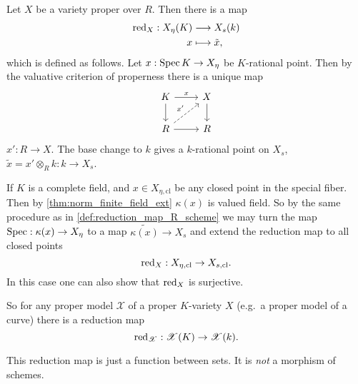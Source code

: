 \begin{definition}\label{def:reduction_map_R_scheme}
	Let $X$ be a variety proper over $R$. 
	Then there is a map 
	\begin{align*}
		\operatorname{red}_X: X_{\eta}(K) &\longrightarrow X_{s}(k) \\
		x &\longmapsto \tilde x
	,\end{align*}
	which is defined as follows. 
	Let $x: \operatorname{Spec} K \to X_\eta$ be $K$-rational point.
	Then by the valuative criterion of properness there is a unique map \[
	\begin{tikzcd}
		K \rar{x} \dar & X \dar \\
		R \rar \ar[dashed]{ur}{x'} & R
	\end{tikzcd}
	\] 
	$x': R \to X$. 
	The base change to $k$ gives a $k$-rational point on $X_s$, $\tilde x = x' \otimes_R k: k \to X_s $.
\end{definition}
\begin{remark}
If $K$ is a complete field, and $x \in X_{\eta, \text{cl}}$ be any closed point in the special fiber.  Then by \cref{thm:norm_finite_field_ext} $\kappa(x)$ is valued field. 
So by the same procedure as in \cref{def:reduction_map_R_scheme} we may turn the map $\operatorname{Spec}: \kappa(x) \to X_{\eta}$ to a map $\widetilde{\kappa(x)} \to X_s$ and extend the reduction map to all closed points \[
\operatorname{red}_X: X_{\eta, \text{cl}} \to X_{s, \text{cl}}
.\] 
In this case one can also show that $\operatorname{red}_X$ is surjective. 
\end{remark}

So for any proper model $\mathscr X$ of a proper $K$-variety $X$ (e.g.\ a proper model of a curve) there is a reduction map \[
	\operatorname{red}_{\mathscr X}: \mathscr X(K) \to \mathscr X(k)
.\] 

\begin{remark}
	This reduction map is just a function between sets. 
	It is \emph{not} a morphism of schemes. 
\end{remark}
